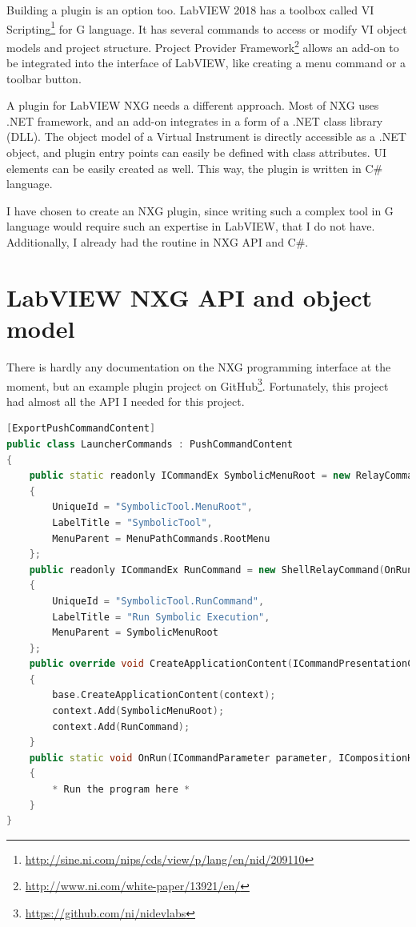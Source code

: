 Building a plugin is an option too. LabVIEW 2018 has a toolbox called VI Scripting\footnote{\url{http://sine.ni.com/nips/cds/view/p/lang/en/nid/209110}} for G language. It has several commands to access or modify VI object models and project structure. Project Provider Framework\footnote{\url{http://www.ni.com/white-paper/13921/en/}} allows an add-on to be integrated into the interface of LabVIEW, like creating a menu command or a toolbar button.

A plugin for LabVIEW NXG needs a different approach. Most of NXG uses .NET framework, and an add-on integrates in a form of a .NET class library (DLL). The object model of a Virtual Instrument is directly accessible as a .NET object, and plugin entry points can easily be defined with class attributes. UI elements can be easily created as well. This way, the plugin is written in C\# language.

I have chosen to create an NXG plugin, since writing such a complex tool in G language would require such an expertise in LabVIEW, that I do not have. Additionally, I already had the routine in NXG API and C\#.
\section{LabVIEW NXG API and object model}
There is hardly any documentation on the NXG programming interface at the moment, but an example plugin project on GitHub\footnote{\url{https://github.com/ni/nidevlabs}}. Fortunately, this project had almost all the API I needed for this project.
\lstset{escapechar=@}
\begin{lstlisting}[frame=single,escapechar=@,float=!ht,caption={The same program using a procedural paradigm},captionpos=b,label={lst:menuapi},language=C++]
[ExportPushCommandContent]
public class LauncherCommands : PushCommandContent
{
    public static readonly ICommandEx SymbolicMenuRoot = new RelayCommandEx(RelayCommandEx.HandleNoOp)
    {
        UniqueId = "SymbolicTool.MenuRoot",
        LabelTitle = "SymbolicTool",
        MenuParent = MenuPathCommands.RootMenu
    };
    public readonly ICommandEx RunCommand = new ShellRelayCommand(OnRun)
    {
        UniqueId = "SymbolicTool.RunCommand",
        LabelTitle = "Run Symbolic Execution",
        MenuParent = SymbolicMenuRoot
    };
    public override void CreateApplicationContent(ICommandPresentationContext context)
    {
        base.CreateApplicationContent(context);
        context.Add(SymbolicMenuRoot);
        context.Add(RunCommand);
    }
    public static void OnRun(ICommandParameter parameter, ICompositionHost host, DocumentEditSite site)
    {
    	* Run the program here *
    }
}
\end{lstlisting}

